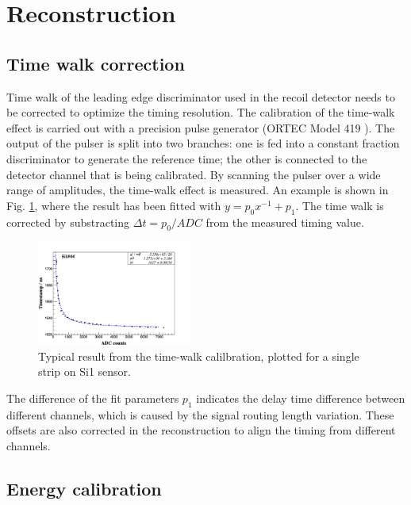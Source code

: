 \documentclass[number,5p]{elsarticle}
\begin{document}
\section{Reconstruction}
\label{sec:reconstruction}

\subsection{Time walk correction}
\label{sec:timewalk}

Time walk of the leading edge discriminator used in the recoil detector needs to be corrected to optimize the timing resolution.
The calibration of the time-walk effect is carried out with a precision pulse generator (ORTEC Model 419 \cite{ortec}). 
The output of the pulser is split into two branches: one is fed into a constant fraction discriminator to generate the reference time;
the other is connected to the detector channel that is being calibrated. 
By scanning the pulser over a wide range of amplitudes, the time-walk effect is measured.
An example is shown in Fig. \ref{fig:timewalk}, where the result has been fitted with \(y=p_0 x^{-1} + p_1\). 
The time walk is corrected by substracting \(\Delta t = p_0/ADC\) from the measured timing value.
\begin{figure}[htbp]
  \centering
  \includegraphics[width=0.45\textwidth]{./timewalk.png}
  \caption{Typical result from the time-walk calilbration, plotted for a single
    strip on Si1 sensor.}
  \label{fig:timewalk}
\end{figure}

The difference of the fit parameters \(p_1\) indicates the delay time
difference between different channels, which is caused by the signal routing length variation.
These offsets are also corrected in the reconstruction to align the timing from different channels.

\subsection{Energy calibration}
\label{sec:calibration}
\end{document}
